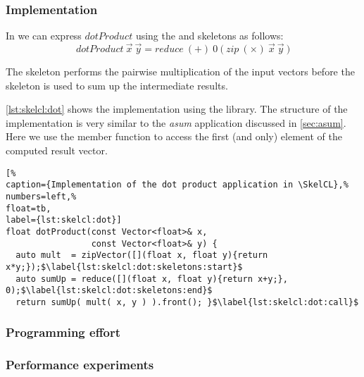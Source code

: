 \subsubsection*{\SkelCL Implementation}
In \SkelCL we can express $dotProduct$ using the \zip and \reduce skeletons as follows:
\begin{equation}
  dotProduct\ \vec{x}\ \vec{y} = reduce\ (+)\ 0\ \big(\ zip\ (\times)\ \vec{x}\ \vec{y}\ \big)
\end{equation}

The \zip skeleton performs the pairwise multiplication of the input vectors before the \reduce skeleton is used to sum up the intermediate results.

\autoref{lst:skelcl:dot} shows the implementation using the \SkelCL library.
The structure of the implementation is very similar to the \emph{asum} application discussed in \autoref{sec:asum}.
Here we use the  member function to access the first (and only) element of the computed result vector.

\begin{lstlisting}[%                                                             
caption={Implementation of the dot product application in \SkelCL},%
numbers=left,%
float=tb,
label={lst:skelcl:dot}]
float dotProduct(const Vector<float>& x,
                 const Vector<float>& y) {
  auto mult  = zipVector([](float x, float y){return x*y;});$\label{lst:skelcl:dot:skeletons:start}$
  auto sumUp = reduce([](float x, float y){return x+y;}, 0);$\label{lst:skelcl:dot:skeletons:end}$
  return sumUp( mult( x, y ) ).front(); }$\label{lst:skelcl:dot:call}$
\end{lstlisting}

\subsubsection*{Programming effort}

\subsubsection*{Performance experiments}



